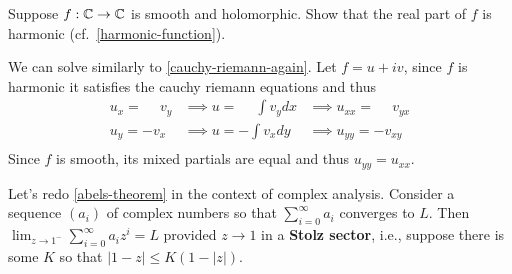 \documentclass{homework}
\begin{document}
\begin{problem}
  Suppose $f : \mathbb{C} \to \mathbb{C}$ is smooth and holomorphic.  Show that the
  real part of $f$ is harmonic (cf.~\ref{harmonic-function}).
\end{problem}
\begin{solution}
We can solve similarly to \ref{cauchy-riemann-again}. Let $f=u+iv$, since $f$ is harmonic it satisfies the cauchy riemann equations and thus
\begin{align*}
u_x=\phantom{-}v_y &\implies u = \phantom{-}\int v_y dx &\implies u_{xx} = \phantom{-}v_{yx}\\
u_y=-v_x &\implies u = -\int v_x dy &\implies u_{yy} = -v_{xy}\\
\end{align*}
Since $f$ is smooth, its mixed partials are equal and thus $u_{yy}=u_{xx}$.
\end{solution}
\begin{problem}
  Let's redo \ref{abels-theorem} in the context of complex analysis.
  Consider a sequence $(a_i)$ of complex numbers so that
  $\sum_{i=0}^\infty a_i$ converges to $L$.  Then
  $\lim_{z \to 1^{-}} \sum_{i=0}^\infty a_i z^i = L$ provided
  $z \to 1$ in a \textbf{Stolz sector}, i.e., suppose there is some
  $K$ so that $|1-z| \leq K(1-|z|)$.
\end{problem}
\end{document}
